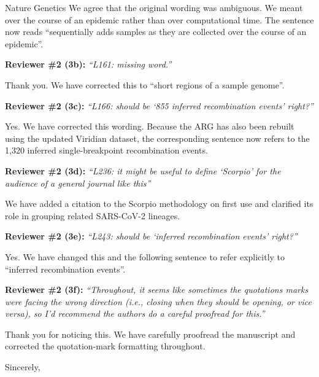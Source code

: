 \documentclass{letter}
\begin{document}
\begin{letter}{Nature Genetics}
We agree that the original wording was ambiguous. We meant over the course of
an epidemic rather than over computational time. The sentence now reads
“sequentially adds samples as they are collected over the course of an
epidemic”.

\noindent \textbf{Reviewer \#2 (3b):} \textit{``L161: missing word.''}

Thank you. We have corrected this to ``short regions of a sample genome''.

\noindent \textbf{Reviewer \#2 (3c):} \textit{``L166: should be `855 inferred
recombination events' right?''}

Yes. We have corrected this wording. Because the ARG has also been rebuilt
using the updated Viridian dataset, the corresponding sentence now refers to
the 1,320 inferred single-breakpoint recombination events.

\noindent \textbf{Reviewer \#2 (3d):} \textit{``L236: it might be useful to define
`Scorpio' for the audience of a general journal like this''}

We have added a citation to the Scorpio methodology on first use and clarified its role
in grouping related SARS-CoV-2 lineages.

\noindent \textbf{Reviewer \#2 (3e):} \textit{``L243: should be `inferred recombination
events' right?''}

Yes. We have changed this and the following sentence to refer explicitly to
``inferred recombination events''.

\noindent \textbf{Reviewer \#2 (3f):} \textit{``Throughout, it seems like sometimes the
quotations marks were facing the wrong direction (i.e., closing when they
should be opening, or vice versa), so I'd recommend the authors do a careful
proofread for this.''}

Thank you for noticing this. We have carefully proofread the manuscript and
corrected the quotation-mark formatting throughout.

\closing{Sincerely,}

\end{letter}
\end{document}
